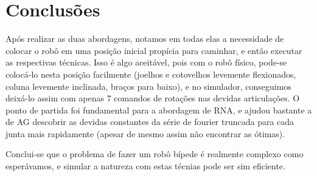 \documentclass[twoside,conference,a4paper]{IEEEtran}
\begin{document}
\section{Conclusões} \label{conclusoes}

Após realizar as duas abordagens, notamos em todas elas a necessidade de colocar o robô em uma posição inicial propícia para caminhar, e então executar as respectivas técnicas. Isso é algo aceitável, pois com o robô físico, pode-se colocá-lo nesta posição facilmente (joelhos e cotovelhos levemente flexionados, coluna levemente inclinada, braços para baixo), e no simulador, conseguimos deixá-lo assim com apenas 7 comandos de rotações nas devidas articulações. O ponto de partida foi fundamental para a abordagem de RNA, e ajudou bastante a de AG descobrir as devidas constantes da série de fourier truncada para cada junta mais rapidamente (apesar de mesmo assim não encontrar as ótimas).

Conclui-se que o problema de fazer um robô bípede é realmente complexo como esperávamos, e simular a natureza com estas técnias pode ser sim eficiente.

\nocite{Aula}



\end{document}
